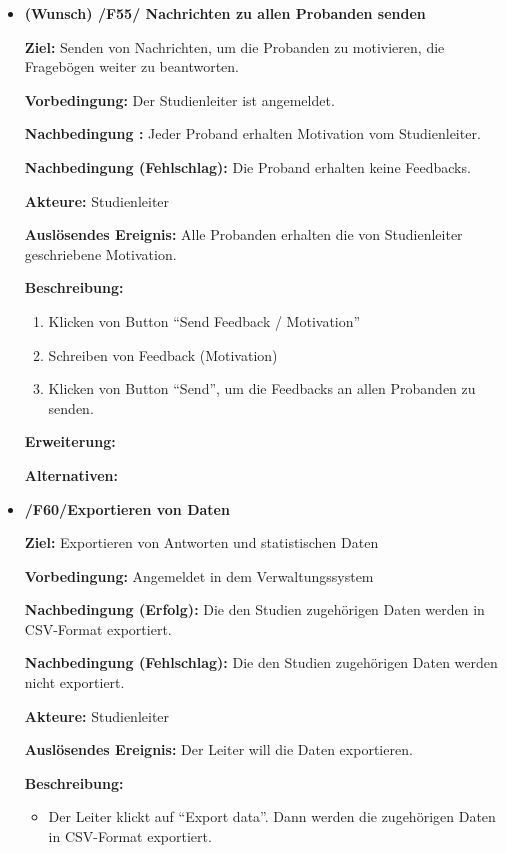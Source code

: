 \documentclass[a4paper]{scrreprt}
\begin{document}
\begin{itemize}
                \item \textbf{(Wunsch) /F55/ Nachrichten zu allen \gls{Proband}en senden}
                \par \textbf{Ziel: }Senden von Nachrichten, um die \gls{Proband}en zu motivieren, die Fragebögen weiter zu beantworten.
                \par \textbf{Vorbedingung: }Der \gls{Studienleiter} ist angemeldet.
                \par \textbf{Nachbedingung : }Jeder \gls{Proband} erhalten Motivation vom \gls{Studienleiter}.
                \par \textbf{Nachbedingung (Fehlschlag): }Die \gls{Proband} erhalten keine Feedbacks.
                \par \textbf{Akteure: }\gls{Studienleiter}
                \par \textbf{Auslösendes Ereignis: }Alle \gls{Proband}en erhalten die von \gls{Studienleiter} geschriebene Motivation.
                \par \textbf{Beschreibung: }
                \begin{enumerate}
                    \item Klicken von Button ``Send Feedback / Motivation''
                    \item Schreiben von Feedback (Motivation)
                    \item Klicken von Button ``Send'', um die Feedbacks an allen \gls{Proband}en zu senden.
                \end{enumerate}
                \par \textbf{Erweiterung: }
                \par \textbf{Alternativen: }


                \item \textbf{/F60/Exportieren von Daten}

                \par \textbf{Ziel: }Exportieren von Antworten und statistischen Daten
                \par \textbf{Vorbedingung: }Angemeldet in dem Verwaltungssystem
                \par \textbf{Nachbedingung (Erfolg): }Die den Studien zugehörigen Daten werden in CSV-Format exportiert.
                \par \textbf{Nachbedingung (Fehlschlag): }Die den Studien zugehörigen Daten werden nicht exportiert.
                \par \textbf{Akteure: }\gls{Studienleiter}
                \par \textbf{Auslösendes Ereignis: }Der Leiter will die Daten exportieren.
                \par \textbf{Beschreibung: }
                \begin{itemize}
                    \item Der Leiter klickt auf ``Export data''. Dann werden die zugehörigen Daten in CSV-Format exportiert.
                \end{itemize}
            \end{itemize}
\end{document}
